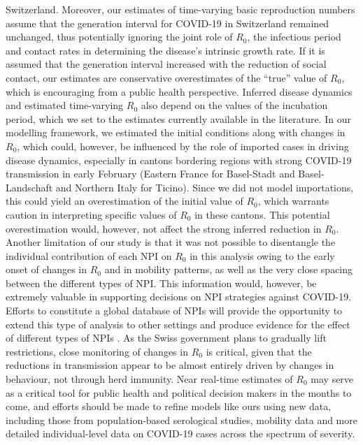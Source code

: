 Switzerland\cite{Stringhini:RepeatedSeroprevalenceAntiSARSCoV2:2020}. Moreover, our estimates of time-varying basic reproduction numbers assume that the generation interval for COVID-19 in Switzerland remained unchanged, thus potentially ignoring the joint role of $R_0$, the infectious period and contact rates in determining the disease’s intrinsic growth rate\cite{Yan:SeparateRolesLatent:2008}. If it is assumed that the generation interval increased with the reduction of social contact, our estimates are conservative overestimates of the “true” value of $R_0$, which is encouraging from a public health perspective. Inferred disease dynamics and estimated time-varying $R_0$ also depend on the values of the incubation period, which we set to the estimates currently available in the literature. In our modelling framework, we estimated the initial conditions along with changes in $R_0$, which could, however, be influenced by the role of imported cases in driving disease dynamics, especially in cantons bordering regions with strong COVID-19 transmission in early February (Eastern France for Basel-Stadt and Basel-Landschaft and Northern Italy for Ticino). Since we did not model importations, this could yield an overestimation of the initial value of $R_0$, which warrants caution in interpreting specific values of $R_0$ in these cantons. This potential overestimation would, however, not affect the strong inferred reduction in $R_0$. Another limitation of our study is that it was not possible to disentangle the individual contribution of each NPI on $R_0$ in this analysis owing to the early onset of changes in $R_0$ and in mobility patterns, as well as the very close spacing between the different types of NPI. This information would, however, be extremely valuable in supporting decisions on NPI strategies against COVID-19. Efforts to constitute a global database of NPIs will provide the opportunity to extend this type of analysis to other settings and produce evidence for the effect of different types of NPIs \cite{HITCOVIDTeam:HealthInterventionsTracking:2020}. As the Swiss government plans to gradually lift restrictions, close monitoring of changes in $R_0$ is critical, given that the reductions in transmission appear to be almost entirely driven by changes in behaviour, not through herd immunity. Near real-time estimates of $R_0$ may serve as a critical tool for public health and political decision makers in the months to come, and efforts should be made to refine models like ours using new data, including those from population-based serological studies, mobility data and more detailed individual-level data on COVID-19 cases across the spectrum of severity.

